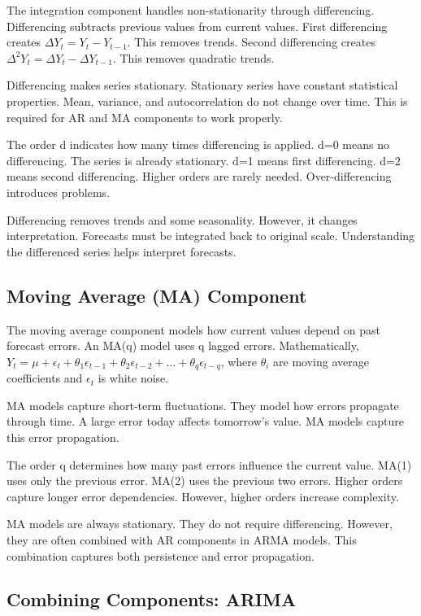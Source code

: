 The integration component handles non-stationarity through differencing. Differencing subtracts previous values from current values. First differencing creates \(\Delta Y_t = Y_t - Y_{t-1}\). This removes trends. Second differencing creates \(\Delta^2 Y_t = \Delta Y_t - \Delta Y_{t-1}\). This removes quadratic trends.

Differencing makes series stationary. Stationary series have constant statistical properties. Mean, variance, and autocorrelation do not change over time. This is required for AR and MA components to work properly.

The order d indicates how many times differencing is applied. d=0 means no differencing. The series is already stationary. d=1 means first differencing. d=2 means second differencing. Higher orders are rarely needed. Over-differencing introduces problems.

Differencing removes trends and some seasonality. However, it changes interpretation. Forecasts must be integrated back to original scale. Understanding the differenced series helps interpret forecasts.

\subsection{Moving Average (MA) Component}

The moving average component models how current values depend on past forecast errors. An MA(q) model uses q lagged errors. Mathematically, \(Y_t = \mu + \epsilon_t + \theta_1 \epsilon_{t-1} + \theta_2 \epsilon_{t-2} + \ldots + \theta_q \epsilon_{t-q}\), where \(\theta_i\) are moving average coefficients and \(\epsilon_t\) is white noise.

MA models capture short-term fluctuations. They model how errors propagate through time. A large error today affects tomorrow's value. MA models capture this error propagation.

The order q determines how many past errors influence the current value. MA(1) uses only the previous error. MA(2) uses the previous two errors. Higher orders capture longer error dependencies. However, higher orders increase complexity.

MA models are always stationary. They do not require differencing. However, they are often combined with AR components in ARMA models. This combination captures both persistence and error propagation.

\subsection{Combining Components: ARIMA}

